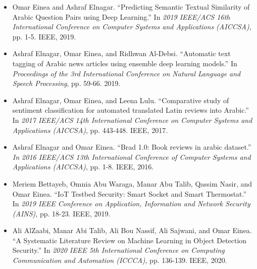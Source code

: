 {  
  \begin{itemize}
    \item Omar Einea and Ashraf Elnagar. ``Predicting Semantic Textual Similarity of Arabic Question Pairs using Deep Learning.'' In \emph{2019 IEEE/ACS 16th International Conference on Computer Systems and Applications (AICCSA)}, pp. 1-5. IEEE, 2019.
    \smallskip
    \item Ashraf Elnagar, Omar Einea, and Ridhwan Al-Debsi. ``Automatic text tagging of Arabic news articles using ensemble deep learning models.'' In \emph{Proceedings of the 3rd International Conference on Natural Language and Speech Processing}, pp. 59-66. 2019.
    \smallskip
    \item Ashraf Elnagar, Omar Einea, and Leena Lulu. ``Comparative study of sentiment classification for automated translated Latin reviews into Arabic.'' In \emph{2017 IEEE/ACS 14th International Conference on Computer Systems and Applications (AICCSA)}, pp. 443-448. IEEE, 2017.
    \smallskip
    \item Ashraf Elnagar and Omar Einea. ``Brad 1.0: Book reviews in arabic dataset.'' \emph{In 2016 IEEE/ACS 13th International Conference of Computer Systems and Applications (AICCSA)}, pp. 1-8. IEEE, 2016.
    \smallskip
    \item Meriem Bettayeb, Omnia Abu Waraga, Manar Abu Talib, Qassim Nasir, and Omar Einea. ``IoT Testbed Security: Smart Socket and Smart Thermostat.'' In \emph{2019 IEEE Conference on Application, Information and Network Security (AINS)}, pp. 18-23. IEEE, 2019.
    \smallskip
    \item Ali AlZaabi, Manar Abi Talib, Ali Bou Nassif, Ali Sajwani, and Omar Einea.\\``A Systematic Literature Review on Machine Learning in Object Detection Security.'' In \emph{2020 IEEE 5th International Conference on Computing Communication and Automation (ICCCA)}, pp. 136-139. IEEE, 2020.
  \end{itemize}
}

